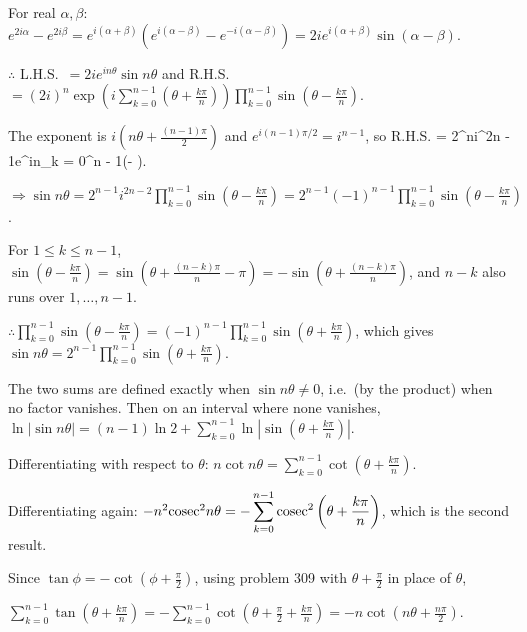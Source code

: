  For real $\alpha, \beta$: $e^{2i\alpha} - e^{2i\beta} = e^{i(\alpha + \beta)}\left(e^{i(\alpha - \beta)} -
  e^{-i(\alpha - \beta)}\right) = 2ie^{i(\alpha + \beta)}\sin(\alpha - \beta)$.

  $\therefore$ L.H.S.\ $= 2ie^{in\theta}\sin n\theta$ and R.H.S.\ $= (2i)^n\exp\left(i\displaystyle\sum_{k = 0}^{n
    - 1}\left(\theta + \frac{k\pi}{n}\right)\right)\prod_{k = 0}^{n - 1}\sin\left(\theta - \frac{k\pi}{n}\right)$.

  The exponent is $i\left(n\theta + \frac{(n - 1)\pi}{2}\right)$ and $e^{i(n - 1)\pi/2} = i^{n - 1}$, so
  \startformula
    {\rm R.H.S.} = 2^ni^{2n - 1}e^{in\theta}\prod_{k = 0}^{n - 1}\sin\left(\theta - \right).
  \stopformula

  $\Rightarrow \sin n\theta = 2^{n - 1}i^{2n - 2}\displaystyle\prod_{k = 0}^{n - 1}\sin\left(\theta -
  \frac{k\pi}{n}\right) = 2^{n - 1}(-1)^{n - 1}\prod_{k = 0}^{n - 1}\sin\left(\theta - \frac{k\pi}{n}\right)$.

  For $1\leq k\leq n - 1$, $\sin\left(\theta - \frac{k\pi}{n}\right) = \sin\left(\theta + \frac{(n - k)\pi}{n}
  - \pi\right) = -\sin\left(\theta + \frac{(n - k)\pi}{n}\right)$, and $n - k$ also runs over $1, \ldots, n - 1$.

  $\therefore \displaystyle\prod_{k = 0}^{n - 1}\sin\left(\theta - \frac{k\pi}{n}\right) = (-1)^{n -
    1}\prod_{k = 0}^{n - 1}\sin\left(\theta + \frac{k\pi}{n}\right)$, which gives $\sin n\theta = 2^{n -
    1}\displaystyle\prod_{k = 0}^{n - 1}\sin\left(\theta + \frac{k\pi}{n}\right)$.

  The two sums are defined exactly when $\sin n\theta\neq 0$, i.e.\ (by the product) when no factor vanishes.
  Then on an interval where none vanishes, $\ln|\sin n\theta| = (n - 1)\ln2 + \displaystyle\sum_{k = 0}^{n -
    1}\ln\left|\sin\left(\theta + \frac{k\pi}{n}\right)\right|$.

  Differentiating with respect to $\theta$: $n\cot n\theta = \displaystyle\sum_{k = 0}^{n - 1}\cot\left(\theta
  + \frac{k\pi}{n}\right)$.

  Differentiating again: $-n^2{\rm cosec}^2n\theta = -\displaystyle\sum_{k = 0}^{n - 1}{\rm
    cosec}^2\left(\theta + \frac{k\pi}{n}\right)$, which is the second result.
\item Since $\tan\phi = -\cot\left(\phi + \frac{\pi}{2}\right)$, using problem 309 with $\theta + \frac{\pi}{2}$
  in place of $\theta$,

  $\displaystyle\sum_{k = 0}^{n - 1}\tan\left(\theta + \frac{k\pi}{n}\right) = -\sum_{k = 0}^{n -
    1}\cot\left(\theta + \frac{\pi}{2} + \frac{k\pi}{n}\right) = -n\cot\left(n\theta + \frac{n\pi}{2}\right)$.

